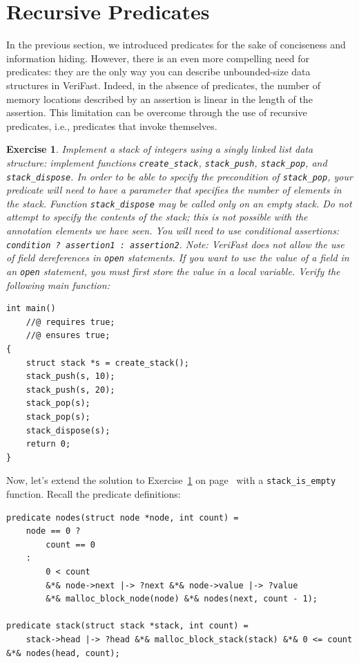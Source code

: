 \documentclass{article}
\newtheorem{exercise}{Exercise}
\begin{document}
\section{Recursive Predicates}

In the previous section, we introduced predicates for the sake
of conciseness and information hiding. However, there is an
even more compelling need for predicates: they are the only way
you can describe unbounded-size data structures in VeriFast.
Indeed, in the absence of predicates, the number of memory
locations described by an assertion is linear in the length of
the assertion. This limitation can be overcome through the use
of recursive predicates, i.e., predicates that invoke
themselves.

\begin{exercise}\label{exercise:stack}
Implement a stack of integers using a singly linked list data
structure: implement functions \lstinline!create_stack!,
\lstinline!stack_push!, \lstinline!stack_pop!, and
\lstinline!stack_dispose!. In order to be able to specify the
precondition of \lstinline!stack_pop!, your predicate will need
to have a parameter that specifies the number of elements in
the stack. Function \lstinline!stack_dispose! may be called
only on an empty stack. Do not attempt to specify the contents
of the stack; this is not possible with the annotation elements
we have seen. You will need to use conditional assertions:
\lstinline!condition ? assertion1 : assertion2!. Note: VeriFast
does not allow the use of field dereferences in
\lstinline!open! statements. If you want to use the value of a
field in an \lstinline!open! statement, you must first store
the value in a local variable. Verify the following main
function:
\end{exercise}
\begin{lstlisting}
int main()
    //@ requires true;
    //@ ensures true;
{
    struct stack *s = create_stack();
    stack_push(s, 10);
    stack_push(s, 20);
    stack_pop(s);
    stack_pop(s);
    stack_dispose(s);
    return 0;
}
\end{lstlisting}

Now, let's extend the solution to Exercise~\ref{exercise:stack}
on page~\pageref{solution:stack} with a
\lstinline!stack_is_empty! function. Recall the predicate
definitions:
\begin{lstlisting}
predicate nodes(struct node *node, int count) =
    node == 0 ?
        count == 0
    :
        0 < count
        &*& node->next |-> ?next &*& node->value |-> ?value
        &*& malloc_block_node(node) &*& nodes(next, count - 1);

predicate stack(struct stack *stack, int count) =
    stack->head |-> ?head &*& malloc_block_stack(stack) &*& 0 <= count &*& nodes(head, count);
\end{lstlisting}
\end{document}
